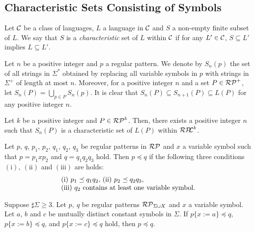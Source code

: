\subsection{Characteristic Sets Consisting of Symbols}\label{subsec:charsets}

\begin{dfn}
    Let $\mathcal{C}$ be a class of languages, $L$ a language in $\mathcal{C}$ and
    $S$ a non-empty finite subset of $L$.
    We say that $S$ is a \textit{characteristic} set of $L$ within $\mathcal{C}$
    if for any $L' \in \mathcal{C}$,
    $S \subseteq L'$ implies $L \subseteq L'$.
\end{dfn}

Let $n$ be a positive integer and $p$ a regular pattern. 
We denote by $S_{n}(p)$ the set of all strings in $\Sigma^{\ast}$ obtained by replacing all variable symbols in $p$
with strings in $\Sigma^{+}$ of length at most $n$.
Moreover, for a positive integer $n$ and a set $P \in \mathcal{RP}^{+}$, 
let $S_{n}(P)=\bigcup_{p \in P}S_{n}(p)$.
It is clear that $S_{n}(P) \subseteq S_{n+1}(P) \subseteq L(P)$ for any positive integer $n$.

\begin{thm}
    Let $k$ be a positive integer and $P \in \mathcal{RP}^{k}$.
    Then, there exists a positive integer $n$ such that $S_{n}(P)$ is a characteristic set of $L(P)$ within $\mathcal{RP\!\!L}^{k}$.
\end{thm}

\begin{thm}\label{Sato1:Lemma9}
    Let $p$, $q$, $p_{1}$, $p_{2}$, $q_{1}$, $q_{2}$, $q_{3}$ be regular patterns in $\mathcal{RP}$ and $x$ a variable symbol such that 
    $p = p_{1}xp_{2}$ and $q = q_{1}q_{2}q_{3}$ hold.
    Then $p \preceq q$ if the following three conditions $(\mathrm{i}),~(\mathrm{ii})$ and $(\mathrm{iii})$ are holds:
    \[
        \begin{tabular}{ll}
            $(\mathrm{i})$ $p_{1} \preceq q_{1}q_{2},$
            $(\mathrm{ii})$ $p_{2} \preceq q_{2}q_{3},$ \\
            $(\mathrm{iii})$ $q_{2}$ contains at least one variable symbol.
        \end{tabular}
    \]
\end{thm}

\begin{lem}\label{Sato1:Lemma10}
    Suppose $\sharp \Sigma \geq 3$.
    {\color{red} Let $p,~q$ be regular patterns $\mathcal{RP}_{\Sigma\cup X}$
    and $x$ a variable symbol.
    Let $a$, $b$ and $c$ be mutually distinct constant symbols in $\Sigma$.
 If $p\{x:=a\}\preceq q$, $p\{x:=b\} \preceq q$, and $p\{x:=c\}\preceq q$ hold,
 then $p\preceq q$.} 
\end{lem}

